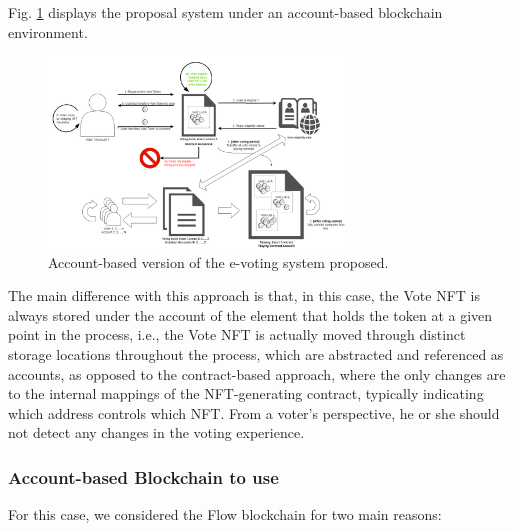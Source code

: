 \documentclass[./4_GeneralApproach.tex]{subfiles}
\begin{document}
Fig. \ref{fig:account_based_architecture} displays the proposal system under an account-based blockchain environment.

\begin{figure}[htp]
    \centering
    \includegraphics[width=0.7\textwidth]{../Images/03_account_based_solution.png}
    \caption{Account-based version of the e-voting system proposed.}
    \label{fig:account_based_architecture}
\end{figure}

The main difference with this approach is that, in this case, the Vote NFT is always stored under the account of the element that holds the token at a given point in the process, i.e., the Vote NFT is actually moved through distinct storage locations throughout the process, which are abstracted and referenced as accounts, as opposed to the contract-based approach, where the only changes are to the internal mappings of the NFT-generating contract, typically indicating which address controls which NFT. From a voter's perspective, he or she should not detect any changes in the voting experience.

\subsubsection{Account-based Blockchain to use}
For this case, we considered the Flow blockchain for two main reasons:
\end{document}
